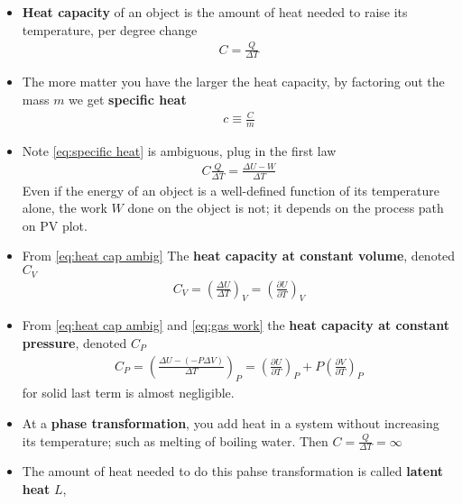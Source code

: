 \documentclass{book}
\begin{document}
\begin{itemize}
  \item \textbf{Heat capacity} of an object is the amount of heat needed to raise its temperature,
        per degree change
        \begin{align}
          \label{eq:heat capacity}
          C = \frac{Q}{\Delta{T}}
        \end{align}
  \item The more matter you have the larger the heat capacity, by factoring out the mass $m$
        we get \textbf{specific heat}
        \begin{align}
          \label{eq:specific heat}
          c \equiv \frac{C}{m}
        \end{align}
  \item Note \eqref{eq:specific heat} is ambiguous, plug in the first law
        \begin{align}
          \label{eq:heat cap ambig}
          C \frac{Q}{\Delta{T}} = \frac{\Delta{U} - W}{\Delta{T}}
        \end{align}
        Even if the energy of an object is a well-defined function of its temperature alone,
        the work $W$ done on the object is not; it depends on the process path on PV plot.
  \item From \eqref{eq:heat cap ambig} The \textbf{heat capacity at constant volume}, denoted $C_{V}$
        \begin{align}
          \label{eq:heat cap v}
          C_{V} = \left( \frac{\Delta{U}}{\Delta{T}} \right) _{V} =
          \left( \frac{\partial U}{\partial T} \right)_{V}
        \end{align}
  \item From \eqref{eq:heat cap ambig} and \eqref{eq:gas work}
        the \textbf{heat capacity at constant pressure}, denoted $C_{P}$
        \begin{align}
          \label{eq:heat cap p}
          C_{P} = \left( \frac{\Delta{U} - (- P \Delta{V})}{\Delta{T}}  \right)_{P}
          = \left ( \frac{\partial U}{\partial T}  \right)_{P}
            + P \left ( \frac{\partial V}{\partial T}  \right)_{P}
        \end{align}
        for solid last term is almost negligible.
  \item At a \textbf{phase transformation}, you add heat in a system without increasing its temperature;
        such as melting of boiling water. Then $C = \frac{Q}{\Delta{T}} = \infty$
  \item The amount of heat needed to do this pahse transformation is called \textbf{latent heat} $L$,

\end{itemize}
\end{document}
